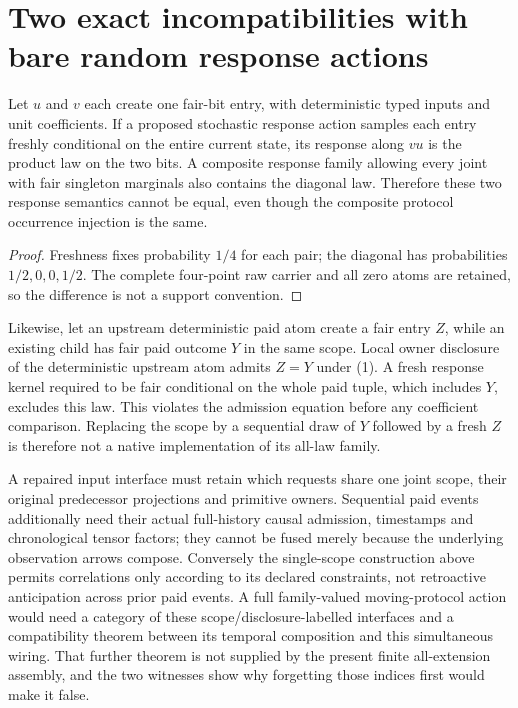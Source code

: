 \documentclass[11pt]{article}
\begin{document}
\section{Two exact incompatibilities with bare random response actions}
\begin{proposition}
Let $u$ and $v$ each create one fair-bit entry, with deterministic typed inputs and unit coefficients. If a proposed stochastic response action samples each entry freshly conditional on the entire current state, its response along $vu$ is the product law on the two bits. A composite response family allowing every joint with fair singleton marginals also contains the diagonal law. Therefore these two response semantics cannot be equal, even though the composite protocol occurrence injection is the same.
\end{proposition}
\begin{proof}
Freshness fixes probability $1/4$ for each pair; the diagonal has probabilities $1/2,0,0,1/2$. The complete four-point raw carrier and all zero atoms are retained, so the difference is not a support convention.\end{proof}

Likewise, let an upstream deterministic paid atom create a fair entry $Z$, while an existing child has fair paid outcome $Y$ in the same scope. Local owner disclosure of the deterministic upstream atom admits $Z=Y$ under (1). A fresh response kernel required to be fair conditional on the whole paid tuple, which includes $Y$, excludes this law. This violates the admission equation before any coefficient comparison. Replacing the scope by a sequential draw of $Y$ followed by a fresh $Z$ is therefore not a native implementation of its all-law family.

A repaired input interface must retain which requests share one joint scope, their original predecessor projections and primitive owners. Sequential paid events additionally need their actual full-history causal admission, timestamps and chronological tensor factors; they cannot be fused merely because the underlying observation arrows compose. Conversely the single-scope construction above permits correlations only according to its declared constraints, not retroactive anticipation across prior paid events. A full family-valued moving-protocol action would need a category of these scope/disclosure-labelled interfaces and a compatibility theorem between its temporal composition and this simultaneous wiring. That further theorem is not supplied by the present finite all-extension assembly, and the two witnesses show why forgetting those indices first would make it false.
\end{document}
